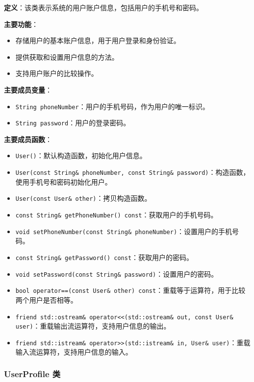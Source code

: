 \documentclass[UTF8, a4paper,12pt]{ctexart}
\begin{document}
\textbf{定义}：该类表示系统的用户账户信息，包括用户的手机号和密码。

\textbf{主要功能}：

\begin{itemize}
    \item 存储用户的基本账户信息，用于用户登录和身份验证。
    \item 提供获取和设置用户信息的方法。
    \item 支持用户账户的比较操作。
\end{itemize}

\textbf{主要成员变量}：

\begin{itemize}
    \item \texttt{String phoneNumber}：用户的手机号码，作为用户的唯一标识。
    \item \texttt{String password}：用户的登录密码。
\end{itemize}

\textbf{主要成员函数}：

\begin{itemize}
    \item \texttt{User()}：默认构造函数，初始化用户信息。
    \item \texttt{User(const String\& phoneNumber, const String\& password)}：构造函数，使用手机号和密码初始化用户。
    \item \texttt{User(const User\& other)}：拷贝构造函数。
    \item \texttt{const String\& getPhoneNumber() const}：获取用户的手机号码。
    \item \texttt{void setPhoneNumber(const String\& phoneNumber)}：设置用户的手机号码。
    \item \texttt{const String\& getPassword() const}：获取用户的密码。
    \item \texttt{void setPassword(const String\& password)}：设置用户的密码。
    \item \texttt{bool operator==(const User\& other) const}：重载等于运算符，用于比较两个用户是否相等。
    \item \texttt{friend std::ostream\& operator<<(std::ostream\& out, const User\& user)}：重载输出流运算符，支持用户信息的输出。
    \item \texttt{friend std::istream\& operator>>(std::istream\& in, User\& user)}：重载输入流运算符，支持用户信息的输入。
\end{itemize}

\subsubsection{UserProfile 类}
\end{document}
